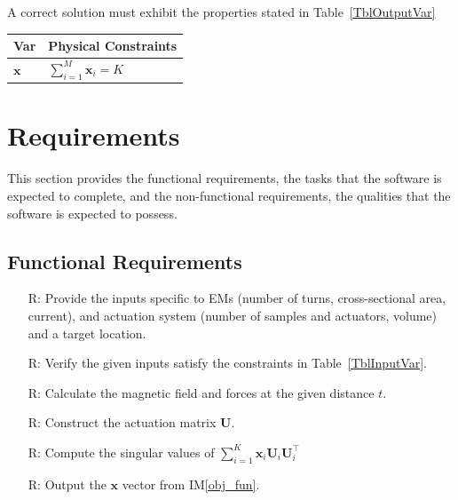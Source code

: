 \documentclass[12pt]{article}
\newcounter{reqnum} %
\begin{document}
\noindent
A correct solution must exhibit the properties stated in Table~\ref{TblOutputVar}

\begin{table}[!h]
\caption{Output Variables} \label{TblOutputVar}
\renewcommand{\arraystretch}{1.2}
\noindent \begin{longtable*}{l l} 
  \toprule
  \textbf{Var} & \textbf{Physical Constraints} \\
  \midrule 
  $\bm x$ & $\sum_{i=1}^{M} \bm x_i = K$
  \\
  \bottomrule
\end{longtable*}
\end{table}


\section{Requirements}
This section provides the functional requirements, the tasks that the
software is expected to complete, and the non-functional requirements, the
qualities that the software is expected to possess.

\subsection{Functional Requirements}

\noindent \begin{itemize}

\item[R\refstepcounter{reqnum}\thereqnum \label{R_Inputs}:] Provide the inputs specific to EMs (number of turns, cross-sectional area, current), and actuation system (number of samples and actuators, volume) and a target location. 
\item[R\refstepcounter{reqnum}\thereqnum \label{R_InputsSat}:] Verify the given inputs satisfy the constraints in Table~\ref{TblInputVar}.
\item[R\refstepcounter{reqnum}\thereqnum \label{R_CalculateMag}:] Calculate the magnetic field and forces at the given distance  $t$.
\item[R\refstepcounter{reqnum}\thereqnum \label{R_CalculateAct}:] Construct the actuation matrix $\mathcal{\bm U}$. 
\item[R\refstepcounter{reqnum}\thereqnum \label{R_CalculateSing}:] Compute the singular values of $\sum_{i=1}^{K}\bm x_i \mathcal{\bm U}_i \mathcal{\bm U}_i^\top$
\item[R\refstepcounter{reqnum}\thereqnum \label{R_CalculateX}:] Output the $\bm x$ vector from IM\ref{obj_fun}.
\end{itemize}
\end{document}
